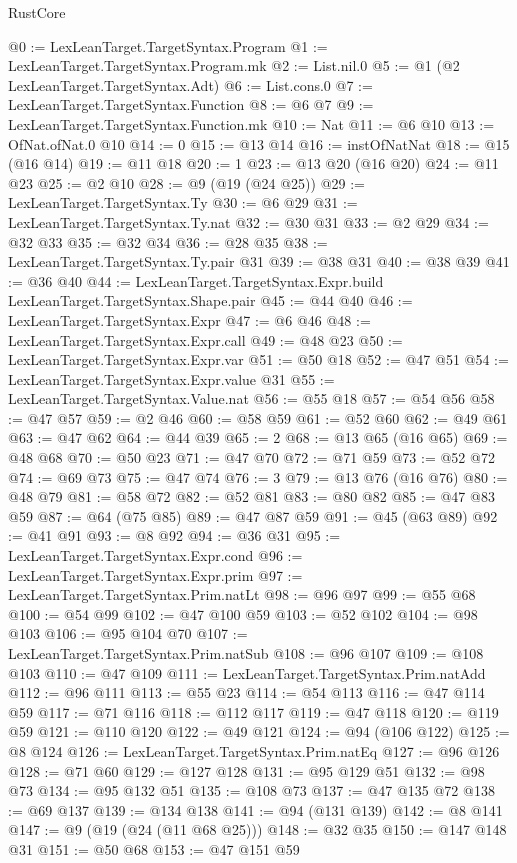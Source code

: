 \begin{lexlean}{RustCore}
\begin{coremodule}
{\begin{coremodule}
{{{{{{{{@0 := LexLeanTarget.TargetSyntax.Program
@1 := LexLeanTarget.TargetSyntax.Program.mk
@2 := List.nil.{0}
@5 := @1 (@2 LexLeanTarget.TargetSyntax.Adt)
@6 := List.cons.{0}
@7 := LexLeanTarget.TargetSyntax.Function
@8 := @6 @7
@9 := LexLeanTarget.TargetSyntax.Function.mk
@10 := Nat
@11 := @6 @10
@13 := OfNat.ofNat.{0} @10
@14 := 0
@15 := @13 @14
@16 := instOfNatNat
@18 := @15 (@16 @14)
@19 := @11 @18
@20 := 1
@23 := @13 @20 (@16 @20)
@24 := @11 @23
@25 := @2 @10
@28 := @9 (@19 (@24 @25))
@29 := LexLeanTarget.TargetSyntax.Ty
@30 := @6 @29
@31 := LexLeanTarget.TargetSyntax.Ty.nat
@32 := @30 @31
@33 := @2 @29
@34 := @32 @33
@35 := @32 @34
@36 := @28 @35
@38 := LexLeanTarget.TargetSyntax.Ty.pair @31
@39 := @38 @31
@40 := @38 @39
@41 := @36 @40
@44 := LexLeanTarget.TargetSyntax.Expr.build LexLeanTarget.TargetSyntax.Shape.pair
@45 := @44 @40
@46 := LexLeanTarget.TargetSyntax.Expr
@47 := @6 @46
@48 := LexLeanTarget.TargetSyntax.Expr.call
@49 := @48 @23
@50 := LexLeanTarget.TargetSyntax.Expr.var
@51 := @50 @18
@52 := @47 @51
@54 := LexLeanTarget.TargetSyntax.Expr.value @31
@55 := LexLeanTarget.TargetSyntax.Value.nat
@56 := @55 @18
@57 := @54 @56
@58 := @47 @57
@59 := @2 @46
@60 := @58 @59
@61 := @52 @60
@62 := @49 @61
@63 := @47 @62
@64 := @44 @39
@65 := 2
@68 := @13 @65 (@16 @65)
@69 := @48 @68
@70 := @50 @23
@71 := @47 @70
@72 := @71 @59
@73 := @52 @72
@74 := @69 @73
@75 := @47 @74
@76 := 3
@79 := @13 @76 (@16 @76)
@80 := @48 @79
@81 := @58 @72
@82 := @52 @81
@83 := @80 @82
@85 := @47 @83 @59
@87 := @64 (@75 @85)
@89 := @47 @87 @59
@91 := @45 (@63 @89)
@92 := @41 @91
@93 := @8 @92
@94 := @36 @31
@95 := LexLeanTarget.TargetSyntax.Expr.cond
@96 := LexLeanTarget.TargetSyntax.Expr.prim
@97 := LexLeanTarget.TargetSyntax.Prim.natLt
@98 := @96 @97
@99 := @55 @68
@100 := @54 @99
@102 := @47 @100 @59
@103 := @52 @102
@104 := @98 @103
@106 := @95 @104 @70
@107 := LexLeanTarget.TargetSyntax.Prim.natSub
@108 := @96 @107
@109 := @108 @103
@110 := @47 @109
@111 := LexLeanTarget.TargetSyntax.Prim.natAdd
@112 := @96 @111
@113 := @55 @23
@114 := @54 @113
@116 := @47 @114 @59
@117 := @71 @116
@118 := @112 @117
@119 := @47 @118
@120 := @119 @59
@121 := @110 @120
@122 := @49 @121
@124 := @94 (@106 @122)
@125 := @8 @124
@126 := LexLeanTarget.TargetSyntax.Prim.natEq
@127 := @96 @126
@128 := @71 @60
@129 := @127 @128
@131 := @95 @129 @51
@132 := @98 @73
@134 := @95 @132 @51
@135 := @108 @73
@137 := @47 @135 @72
@138 := @69 @137
@139 := @134 @138
@141 := @94 (@131 @139)
@142 := @8 @141
@147 := @9 (@19 (@24 (@11 @68 @25)))
@148 := @32 @35
@150 := @147 @148 @31
@151 := @50 @68
@153 := @47 @151 @59
}}}}}}}}
\end{coremodule}}
\end{coremodule}
\end{lexlean}
